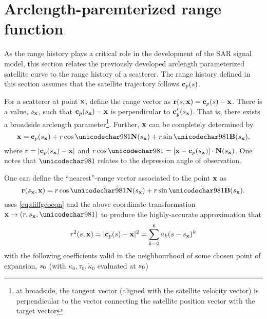 \section{Arclength-paremterized range function}
\label{sc:rangeHistory}
As the range history plays a critical role in the development of the SAR signal model, this section relates the previously developed arclength parameterized satellite curve to the range history of a scatterer. The range history defined in this section assumes that the satellite trajectory follows $\mathbf{c}_p(s)$. 
\par
For a scatterer at point $\mathbf{\mathbf{x}}$, define the range vector as $\mathbf{r}(s, \mathbf{\mathbf{x}}) = \mathbf{c}_p(s) - \mathbf{\mathbf{x}}$. There is a value, $s_{\mathbf{x}}$, such that $\mathbf{c}_p(s_{\mathbf{x}}) - \mathbf{\mathbf{x}}$ is perpendicular to $\mathbf{c}_p'(s_{\mathbf{x}})$. That is, there exists a broadside arclength parameter\footnote{at broadside, the tangent vector (aligned with the satellite velocity vector) is perpendicular to the vector connecting the satellite position vector with the target vector}. Further, $\mathbf{\mathbf{x}}$ can be completely determined by 
\begin{equation}
 \vct\target = \satp(\targetxparm) + \targetrange\cos\targetdepression\vct{N}(\targetxparm) + \targetrange\sin\targetdepression\vct{B}(\targetxparm),
\end{equation}
where $r=\lvert\mathbf{c}_p(s_{\mathbf{x}})-\mathbf{\mathbf{x}}\rvert$ and $\targetrange\cos\targetdepression = [\vct\target - \satp(\targetxparm)]\cdot\vct{N}(\targetxparm)$. One notes that $\targetdepression$ relates to the depression angle of observation. 
\par
One can define the ``nearest''-range vector associated to the point $\mathbf{\mathbf{x}}$ as  
\begin{equation}
\rangeVector{\targetxparm, \vct\target} = \targetrange\cos\targetdepression\vct{N}(\targetxparm) + \targetrange\sin\targetdepression\vct{B}(\targetxparm).
\end{equation}
 uses \eqref{eq:diffgeoeqn} and the above coordinate transformation $\vct\target\rightarrow(\targetrange, \targetxparm, \targetdepression)$ to produce the highly-accurate approximation that 
\begin{equation}
 \targetrange^2(\parm, \vct\target) = \lvert\satp(\parm)-\vct\target\rvert^2 = \sum_{k=0}^6\rcoeff_k(\parm-\targetxparm)^k
 \label{eq:bestRangeEquation}
\end{equation}
with the following coefficients valid in the neighbourhood of some chosen point of expansion, $s_0$ (with $\kappa_0, \tau_0, \dot{\kappa}_0$ evaluated at $s_0$)
